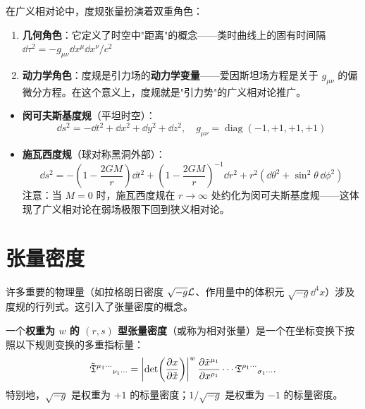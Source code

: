 \begin{note}[物理意义]
在广义相对论中，度规张量扮演着双重角色：
\begin{enumerate}
    \item \textbf{几何角色}：它定义了时空中"距离"的概念——类时曲线上的固有时间隔 $\dd \tau^2 = -g_{\mu\nu} \dd x^\mu \dd x^\nu / c^2$
    \item \textbf{动力学角色}：度规是引力场的\textbf{动力学变量}——爱因斯坦场方程是关于 $g_{\mu\nu}$ 的偏微分方程。在这个意义上，度规就是"引力势"的广义相对论推广。
\end{enumerate}
\end{note}

\begin{itemize}
    \item \textbf{闵可夫斯基度规}（平坦时空）：
    \begin{equation}
        \dd s^2 = -\dd t^2 + \dd x^2 + \dd y^2 + \dd z^2, \quad g_{\mu\nu} = \operatorname{diag}(-1, +1, +1, +1)
    \end{equation}
    \item \textbf{施瓦西度规}（球对称黑洞外部）：
    \begin{equation}
        \dd s^2 = -\left(1 - \frac{2GM}{r}\right) \dd t^2 + \left(1 - \frac{2GM}{r}\right)^{-1} \dd r^2 + r^2(\dd\theta^2 + \sin^2\theta\,\dd\phi^2)
    \end{equation}
    注意：当 $M=0$ 时，施瓦西度规在 $r \to \infty$ 处约化为闵可夫斯基度规——这体现了广义相对论在弱场极限下回到狭义相对论。
\end{itemize}

\section{张量密度}

许多重要的物理量（如拉格朗日密度 $\sqrt{-g} \mathcal{L}$、作用量中的体积元 $\sqrt{-g} \dd^4 x$）涉及度规的行列式。这引入了张量密度的概念。

\begin{definition}[张量密度]
一个\textbf{权重为 $w$ 的 $(r,s)$ 型张量密度}（或称为相对张量）是一个在坐标变换下按照以下规则变换的多重指标量：
\begin{equation}
    \tilde{\mathfrak{T}}^{\mu_1\cdots}{}_{\nu_1\cdots}
    = \left|\det\!\left(\frac{\partial x}{\partial \tilde{x}}\right)\right|^{w}
    \frac{\partial \tilde{x}^{\mu_1}}{\partial x^{\rho_1}} \cdots
    \mathfrak{T}^{\rho_1\cdots}{}_{\sigma_1\cdots}.
\end{equation}
特别地，$\sqrt{-g}$ 是权重为 $+1$ 的标量密度；$1/\sqrt{-g}$ 是权重为 $-1$ 的标量密度。
\end{definition}


